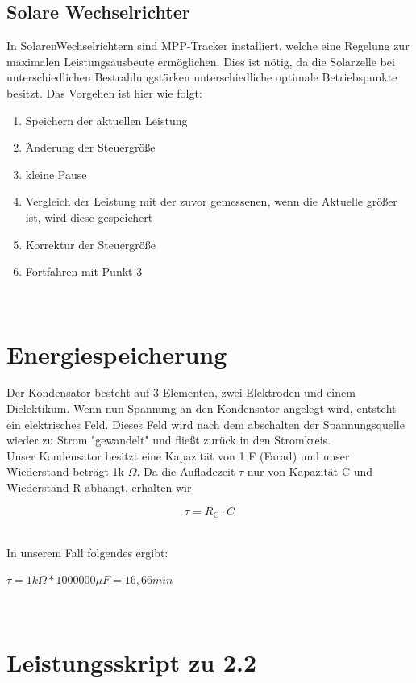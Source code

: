 \documentclass[a4paper,12pt]{article}
\begin{document}
\subsection{Solare Wechselrichter}
In SolarenWechselrichtern sind MPP-Tracker installiert, welche eine Regelung zur maximalen Leistungsausbeute ermöglichen. Dies ist nötig, da die Solarzelle bei unterschiedlichen Bestrahlungstärken unterschiedliche optimale Betriebspunkte besitzt.
Das Vorgehen ist hier wie folgt:
\begin{enumerate}
 \item Speichern der aktuellen Leistung
 \item Änderung der Steuergröße
 \item kleine Pause
 \item Vergleich der Leistung mit der zuvor gemessenen, wenn die Aktuelle größer ist, wird diese gespeichert
 \item Korrektur der Steuergröße
 \item Fortfahren mit Punkt 3
\end{enumerate}
~\cite{MPPT}

\section{Energiespeicherung}
Der Kondensator besteht auf 3 Elementen, zwei Elektroden und einem Dielektikum. Wenn nun Spannung an den Kondensator angelegt wird, entsteht ein elektrisches Feld. Dieses Feld wird nach dem abschalten der Spannungsquelle wieder zu Strom "gewandelt" und fließt zurück in den Stromkreis. \\
Unser Kondensator besitzt eine Kapazität von 1 F (Farad) und unser Wiederstand beträgt 1k $\Omega$. Da die Aufladezeit $\tau$ nur von Kapazität C und Wiederstand R abhängt, erhalten wir\\
\large \begin{center}
       $$ \tau = R_{\mathrm{C}} \cdot C $$ \end{center}\\
\normalsize In unserem Fall folgendes ergibt:\newline
\large \begin{center}$ \tau = 1 k \Omega * 1000000 \mu F  = 16,66 min$\end{center}\\




\appendix
\section{Leistungsskript zu 2.2}

\end{document}
